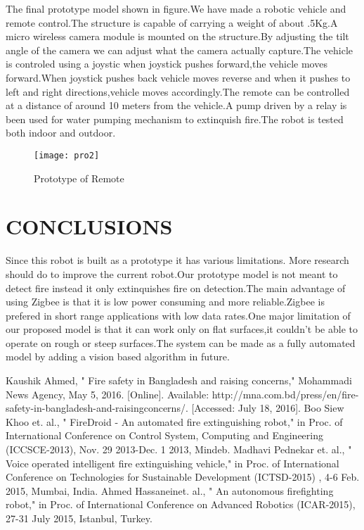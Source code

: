 \documentclass[12pt,a4paper]{report}
\begin{document}
\hspace*{1cm}The final prototype model shown in figure.We have made a robotic vehicle and remote control.The structure is capable of carrying a weight of about .5Kg.A micro wireless camera module is mounted on the structure.By adjusting the tilt angle of the camera we can adjust what the camera actually capture.The vehicle is controled using a joystic when joystick pushes forward,the vehicle moves forward.When joystick pushes back vehicle moves reverse and when it pushes to left and right directions,vehicle moves accordingly.The remote can be controlled at a distance of around 10 meters from the vehicle.A pump driven by a relay is been used for water pumping mechanism to extinquish fire.The robot is tested both indoor and outdoor.  
\newpage
\begin{figure}[h!]
\centering
\texttt{[image: pro2]}
\caption{Prototype of Remote}
\label{circuit}
\end{figure}








\newpage



\chapter{{CONCLUSIONS}}


\hspace*{1cm} Since this robot is built as a prototype it has various limitations. More research should do to improve the current robot.Our prototype model is not meant to detect fire instead it only extinquishes fire on detection.The main advantage of using Zigbee is that it is low power consuming and more reliable.Zigbee is prefered in short range applications with low data rates.One major limitation of our proposed model is that it can work only on flat surfaces,it couldn't be able to operate on rough or steep surfaces.The system can be made as a fully automated model by adding a vision based algorithm in future.

\begin{thebibliography}{99}

 \bibitem{}  Kaushik Ahmed, " Fire safety in Bangladesh and raising concerns," Mohammadi News Agency, May 5, 2016. [Online].      Available: http://mna.com.bd/press/en/fire-safety-in-bangladesh-and-raisingconcerns/. [Accessed: July 18, 2016]. 
 \bibitem{}  Boo Siew Khoo et. al., " FireDroid - An automated fire extinguishing robot," in Proc. of International Conference on Control System, Computing and Engineering (ICCSCE-2013), Nov. 29 2013-Dec. 1 2013, Mindeb. 
  \bibitem{} Madhavi Pednekar et. al., " Voice operated intelligent fire extinguishing vehicle," in Proc. of International Conference on Technologies for Sustainable Development (ICTSD-2015) , 4-6 Feb. 2015, Mumbai, India. 
  \bibitem{}  Ahmed Hassaneinet. al., " An autonomous firefighting robot," in Proc. of International Conference on Advanced Robotics (ICAR-2015), 27-31 July 2015, Istanbul, Turkey. 
   
\end{thebibliography}
\end{document}

